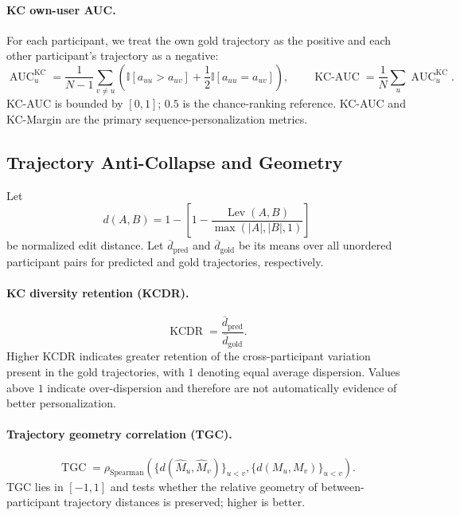 \paragraph{KC own-user AUC.}
For each participant, we treat the own gold trajectory as the positive and
each other participant's trajectory as a negative:
\begin{equation}
\operatorname{AUC}_u^{\mathrm{KC}}
=\frac{1}{N-1}\sum_{v\ne u}
\left(
\mathbb I[a_{uu}>a_{uv}]
+\frac{1}{2}\mathbb I[a_{uu}=a_{uv}]
\right),
\qquad
\operatorname{KC\text{-}AUC}
=\frac{1}{N}\sum_u\operatorname{AUC}_u^{\mathrm{KC}} .
\label{eq:kc_own_user_auc}
\end{equation}
KC-AUC is bounded by \([0,1]\); \(0.5\) is the chance-ranking reference.
KC-AUC and KC-Margin are the primary sequence-personalization metrics.

\subsection{Trajectory Anti-Collapse and Geometry}

Let
\[
d(A,B)=1-\left[1-
\frac{\operatorname{Lev}(A,B)}{\max(|A|,|B|,1)}\right]
\]
be normalized edit distance. Let
\(\overline d_{\mathrm{pred}}\) and \(\overline d_{\mathrm{gold}}\)
be its means over all unordered participant pairs for predicted and gold
trajectories, respectively.

\paragraph{KC diversity retention (KCDR).}
\begin{equation}
\operatorname{KCDR}
=\frac{\overline d_{\mathrm{pred}}}{\overline d_{\mathrm{gold}}}.
\label{eq:kcdr}
\end{equation}
Higher KCDR indicates greater retention of the cross-participant variation
present in the gold trajectories, with \(1\) denoting equal average
dispersion. Values above \(1\) indicate over-dispersion and therefore are not
automatically evidence of better personalization.

\paragraph{Trajectory geometry correlation (TGC).}
\begin{equation}
\operatorname{TGC}
=\rho_{\mathrm{Spearman}}
\left(
\{d(\widehat M_u,\widehat M_v)\}_{u<v},
\{d(M_u,M_v)\}_{u<v}
\right).
\label{eq:tgc}
\end{equation}
TGC lies in \([-1,1]\) and tests whether the relative geometry of
between-participant trajectory distances is preserved; higher is better.

